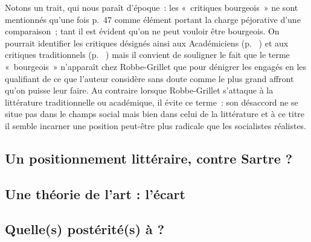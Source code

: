 \documentclass[12pt, a4paper]{article}
\begin{document}






Notons un trait, qui nous paraît d'époque~: les «~critiques bourgeois~» ne sont mentionnés qu'une fois p.~47 comme élément portant la charge péjorative d'une comparaison~; tant il est évident qu'on ne peut vouloir être bourgeois. On pourrait identifier les critiques désignés ainsi aux Académiciens (p.~%
) et aux critiques traditionnels (p.~%
) mais il convient de souligner le fait que le terme «~bourgeois~» n'apparaît chez Robbe-Grillet que pour dénigrer les engagés en les qualifiant de ce que l'auteur considère sans doute comme le plus grand affront qu'on puisse leur faire. Au contraire lorsque Robbe-Grillet s'attaque à la littérature traditionnelle ou académique, il évite ce terme~: son désaccord ne se situe pas dans le champs social mais bien dans celui de la littérature et à ce titre il semble incarner une position peut-être plus radicale que les socialistes réalistes.


\subsection{Un positionnement littéraire, contre Sartre ?}
\label{vsSartre}


\subsection{Une théorie de l'art : l'écart}

\subsection{Quelle(s) postérité(s) à \punr?}

    


\newpage
{}
\end{document}
